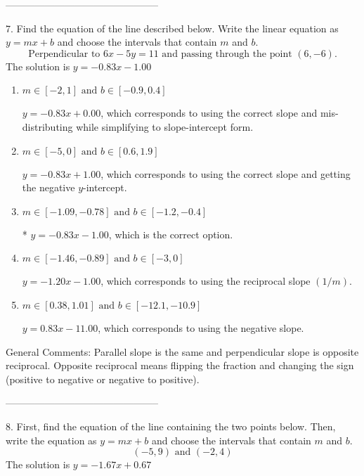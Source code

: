 \documentclass{extbook}[14pt]
\begin{document}
-----------------------------------------------

7. Find the equation of the line described below. Write the linear equation as $ y=mx+b $ and choose the intervals that contain $m$ and $b$.
\[ \text{Perpendicular to } 6 x - 5 y = 11 \text{ and passing through the point } (6, -6). \] 
The solution is $ y = -0.83x - 1.00 $ 

\begin{enumerate}[label=\Alph*.] 
\item $ m \in [-2, 1] \text{ and } b \in [-0.9, 0.4] $ 

  $y = -0.83x + 0.00$, which corresponds to using the correct slope and mis-distributing while simplifying to slope-intercept form. 
\item $ m \in [-5, 0] \text{ and } b \in [0.6, 1.9] $ 

  $y = -0.83x + 1.00$, which corresponds to using the correct slope and getting the negative $y$-intercept. 
\item $ m \in [-1.09, -0.78] \text{ and } b \in [-1.2, -0.4] $ 

 * $y = -0.83x - 1.00$, which is the correct option. 
\item $ m \in [-1.46, -0.89] \text{ and } b \in [-3, 0] $ 

  $y = -1.20x - 1.00$, which corresponds to using the reciprocal slope $(1/m)$. 
\item $ m \in [0.38, 1.01] \text{ and } b \in [-12.1, -10.9] $ 

  $y = 0.83x - 11.00$, which corresponds to using the negative slope. 
\end{enumerate} 
 
General Comments: Parallel slope is the same and perpendicular slope is opposite reciprocal. Opposite reciprocal means flipping the fraction and changing the sign (positive to negative or negative to positive).

-----------------------------------------------

8. First, find the equation of the line containing the two points below. Then, write the equation as $ y=mx+b $ and choose the intervals that contain $m$ and $b$.
\[ (-5, 9) \text{ and } (-2, 4) \] 
The solution is $ y = -1.67x + 0.67 $ 
\end{document}
